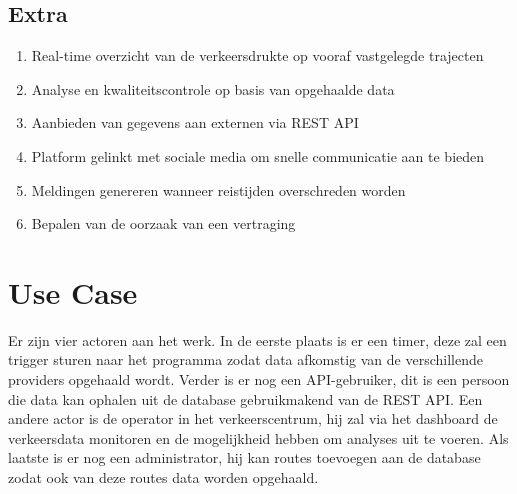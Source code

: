 \documentclass[ps,a4paper,oneside]{report}
\begin{document}
\subsection{Extra}
\begin{enumerate}
\item Real-time overzicht van de verkeersdrukte op vooraf vastgelegde trajecten
\item Analyse en kwaliteitscontrole op basis van opgehaalde data
\item Aanbieden van gegevens aan externen via REST API
\item Platform gelinkt met sociale media om snelle communicatie aan te bieden
\item Meldingen genereren wanneer reistijden overschreden worden
\item Bepalen van de oorzaak van een vertraging
\end{enumerate}
\section{Use Case}
Er zijn vier actoren aan het werk. In de eerste plaats is er een timer, deze zal een trigger sturen naar het programma zodat data afkomstig van de verschillende providers opgehaald wordt. Verder is er nog een API-gebruiker, dit is een persoon die data kan ophalen uit de database gebruikmakend van de REST API. Een andere actor is de operator in het verkeerscentrum, hij zal via het dashboard de verkeersdata monitoren en de mogelijkheid hebben om analyses uit te voeren. Als laatste is er nog een administrator, hij kan routes toevoegen aan de database zodat ook van deze routes data worden opgehaald.
\clearpage
\end{document}
